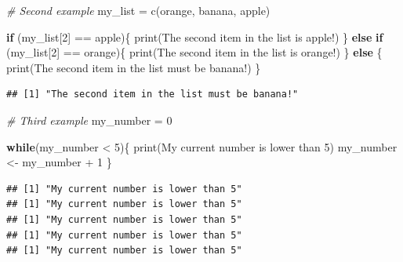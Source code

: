 \documentclass[
]{book}
\newenvironment{Shaded}{\begin{snugshade}}{\end{snugshade}}
\newcommand{\CommentTok}[1]{\textcolor[rgb]{0.56,0.35,0.01}{\textit{#1}}}
\newcommand{\ControlFlowTok}[1]{\textcolor[rgb]{0.13,0.29,0.53}{\textbf{#1}}}
\newcommand{\DecValTok}[1]{\textcolor[rgb]{0.00,0.00,0.81}{#1}}
\newcommand{\FunctionTok}[1]{\textcolor[rgb]{0.00,0.00,0.00}{#1}}
\newcommand{\NormalTok}[1]{#1}
\newcommand{\OtherTok}[1]{\textcolor[rgb]{0.56,0.35,0.01}{#1}}
\newcommand{\SpecialCharTok}[1]{\textcolor[rgb]{0.00,0.00,0.00}{#1}}
\newcommand{\StringTok}[1]{\textcolor[rgb]{0.31,0.60,0.02}{#1}}
\begin{document}
\begin{Shaded}
\begin{Highlighting}[]
\CommentTok{\# Second example}
\NormalTok{my\_list }\OtherTok{=} \FunctionTok{c}\NormalTok{(}\StringTok{\textquotesingle{}orange\textquotesingle{}}\NormalTok{, }\StringTok{\textquotesingle{}banana\textquotesingle{}}\NormalTok{, }\StringTok{\textquotesingle{}apple\textquotesingle{}}\NormalTok{)}

\ControlFlowTok{if}\NormalTok{ (my\_list[}\DecValTok{2}\NormalTok{] }\SpecialCharTok{==} \StringTok{\textquotesingle{}apple\textquotesingle{}}\NormalTok{)\{}
  \FunctionTok{print}\NormalTok{(}\StringTok{\textquotesingle{}The second item in the list is apple!\textquotesingle{}}\NormalTok{)}
\NormalTok{\} }\ControlFlowTok{else} \ControlFlowTok{if}\NormalTok{ (my\_list[}\DecValTok{2}\NormalTok{] }\SpecialCharTok{==} \StringTok{\textquotesingle{}orange\textquotesingle{}}\NormalTok{)\{}
  \FunctionTok{print}\NormalTok{(}\StringTok{\textquotesingle{}The second item in the list is orange!\textquotesingle{}}\NormalTok{)}
\NormalTok{\} }\ControlFlowTok{else}\NormalTok{ \{}
  \FunctionTok{print}\NormalTok{(}\StringTok{\textquotesingle{}The second item in the list must be banana!\textquotesingle{}}\NormalTok{)}
\NormalTok{\}}
\end{Highlighting}
\end{Shaded}

\begin{verbatim}
## [1] "The second item in the list must be banana!"
\end{verbatim}

\begin{Shaded}
\begin{Highlighting}[]
\CommentTok{\# Third example}
\NormalTok{my\_number }\OtherTok{=} \DecValTok{0}

\ControlFlowTok{while}\NormalTok{(my\_number }\SpecialCharTok{\textless{}} \DecValTok{5}\NormalTok{)\{}
  \FunctionTok{print}\NormalTok{(}\StringTok{\textquotesingle{}My current number is lower than 5\textquotesingle{}}\NormalTok{)}
\NormalTok{  my\_number }\OtherTok{\textless{}{-}}\NormalTok{ my\_number }\SpecialCharTok{+} \DecValTok{1}
\NormalTok{\}}
\end{Highlighting}
\end{Shaded}

\begin{verbatim}
## [1] "My current number is lower than 5"
## [1] "My current number is lower than 5"
## [1] "My current number is lower than 5"
## [1] "My current number is lower than 5"
## [1] "My current number is lower than 5"
\end{verbatim}
\end{document}
